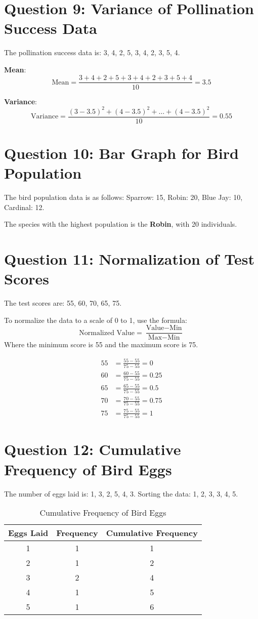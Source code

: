\documentclass[11pt]{article}
\begin{document}
\section*{Question 9: Variance of Pollination Success Data}
The pollination success data is: 3, 4, 2, 5, 3, 4, 2, 3, 5, 4.

\textbf{Mean}:
\[
\text{Mean} = \frac{3 + 4 + 2 + 5 + 3 + 4 + 2 + 3 + 5 + 4}{10} = 3.5
\]

\textbf{Variance}:
\[
\text{Variance} = \frac{(3-3.5)^2 + (4-3.5)^2 + \dots + (4-3.5)^2}{10} = 0.55
\]

\section*{Question 10: Bar Graph for Bird Population}
The bird population data is as follows:
Sparrow: 15, Robin: 20, Blue Jay: 10, Cardinal: 12.

The species with the highest population is the \textbf{Robin}, with 20 individuals.

\section*{Question 11: Normalization of Test Scores}
The test scores are: 55, 60, 70, 65, 75.

To normalize the data to a scale of 0 to 1, use the formula:
\[
\text{Normalized Value} = \frac{\text{Value} - \text{Min}}{\text{Max} - \text{Min}}
\]
Where the minimum score is 55 and the maximum score is 75.

\begin{align*}
55 & = \frac{55 - 55}{75 - 55} = 0 \\
60 & = \frac{60 - 55}{75 - 55} = 0.25 \\
65 & = \frac{65 - 55}{75 - 55} = 0.5 \\
70 & = \frac{70 - 55}{75 - 55} = 0.75 \\
75 & = \frac{75 - 55}{75 - 55} = 1
\end{align*}

\section*{Question 12: Cumulative Frequency of Bird Eggs}
The number of eggs laid is: 1, 3, 2, 5, 4, 3. Sorting the data: 1, 2, 3, 3, 4, 5.

\begin{table}[h]
\centering
\begin{tabular}{|c|c|c|}
\hline
\textbf{Eggs Laid} & \textbf{Frequency} & \textbf{Cumulative Frequency} \\
\hline
1 & 1 & 1 \\
\hline
2 & 1 & 2 \\
\hline
3 & 2 & 4 \\
\hline
4 & 1 & 5 \\
\hline
5 & 1 & 6 \\
\hline
\end{tabular}
\caption{Cumulative Frequency of Bird Eggs}
\end{table}
\end{document}
